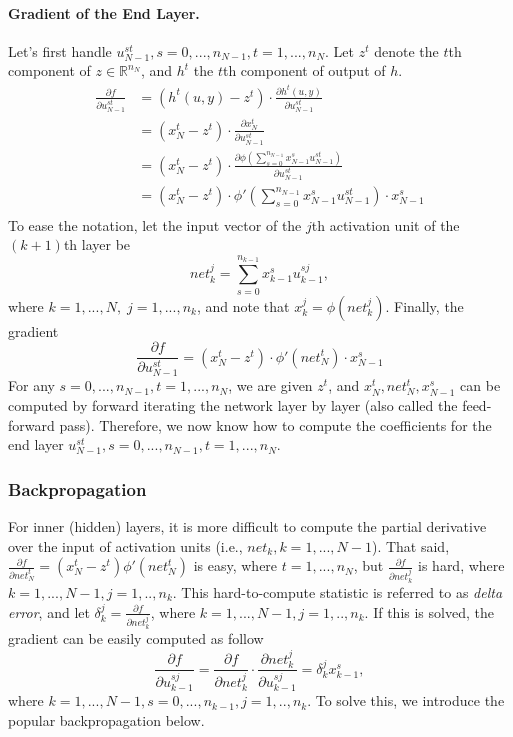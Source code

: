 \paragraph{Gradient of the End Layer.}
Let's first handle $u_{N-1}^{st}, s = 0,...,n_{N-1}, t = 1,...,n_N$.
Let $z^t$ denote the $t$th component of $z \in \mathbb{R}^{n_N}$, and $h^t$ the $t$th component of output of $h$.
\[\begin{aligned}
    \frac{\partial f}{\partial u_{N-1}^{st}}
    &= \left( h^t(u, y) - z^t \right) \cdot \frac{\partial h^t(u, y)}{\partial u_{N-1}^{st}} \\
    &= \left( x_N^t - z^t \right) \cdot \frac{\partial x_N^t}{\partial u_{N-1}^{st}} \\
    &= \left( x_N^t - z^t \right) \cdot \frac{\partial \phi \left( \sum_{s=0}^{n_{N-1}} x_{N-1}^s u_{N-1}^{st} \right)}{\partial u_{N-1}^{st}} \\
    &= \left( x_N^t - z^t \right) \cdot \phi' \left( \sum_{s=0}^{n_{N-1}} x_{N-1}^s u_{N-1}^{st} \right) \cdot x_{N-1}^s \\
\end{aligned}\]
To ease the notation, let the input vector of the $j$th activation unit of the $(k+1)$th layer be
\[\mathit{net}_k^j =\sum_{s=0}^{n_{k-1}} x_{k-1}^s u_{k-1}^{sj},\]
where $k = 1,...,N, \; j = 1,...,n_k$, and note that $x_k^j =\phi(\mathit{net}_k^j)$. Finally, the gradient
\[\frac{\partial f}{\partial u_{N-1}^{st}} = \left( x_N^t - z^t \right) \cdot \phi' ( \mathit{net}_N^t ) \cdot x_{N-1}^s\]
For any $s = 0,...,n_{N-1}, t =1,...,n_N$, we are given $z^t$, and $x_N^t, \mathit{net}_N^t, x_{N-1}^s$ can be computed by forward iterating the network layer by layer (also called the feed-forward pass). Therefore, we now know how to compute the coefficients for the end layer $u_{N-1}^{st}, s = 0,...,n_{N-1}, t =1,...,n_N$.

\subsubsection{Backpropagation}
For inner (hidden) layers, it is more difficult to compute the partial derivative over the input of activation units (i.e., $\mathit{net}_k, k = 1,...,N-1$).
That said, $\frac{\partial f}{\partial \mathit{net}_N^t} = (x_N^t - z^t) \phi'(\mathit{net}_N^t)$ is easy, where $t = 1,...,n_N$, but $\frac{\partial f}{\partial \mathit{net}_k^j}$ is hard, where $k = 1,...,N-1, j = 1,..,n_k$.
This hard-to-compute statistic is referred to as \textit{delta error}, and let $\delta_k^j = \frac{\partial f}{\partial \mathit{net}_k^j}$, where $k = 1,...,N-1, j = 1,..,n_k$.
If this is solved, the gradient can be easily computed as follow
\[\frac{\partial f}{\partial u_{k-1}^{sj}} = \boxed{\frac{\partial f}{\partial \mathit{net}_k^j}} \cdot \frac{\partial \mathit{net}_k^j}{\partial u_{k-1}^{sj}} = \boxed{\delta_k^j} x_{k-1}^s,\]
where $k = 1,...,N-1, s = 0,...,n_{k-1}, j = 1,..,n_k$.
To solve this, we introduce the popular backpropagation below.

